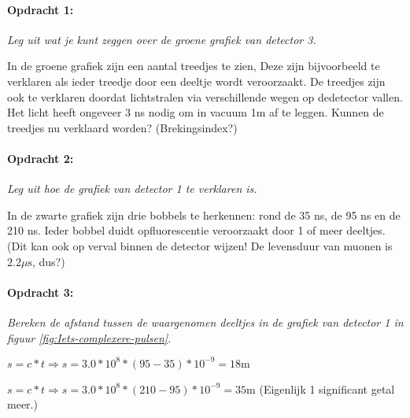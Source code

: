 \begin{minipage}[t]{1\columnwidth}%

\paragraph{Opdracht 1:}

\textit{Leg uit wat je kunt zeggen over de groene grafiek van detector
3. }

%
In de groene grafiek zijn een aantal treedjes te zien, Deze zijn bijvoorbeeld
te verklaren als ieder treedje door een deeltje wordt veroorzaakt.
De treedjes zijn ook te verklaren doordat lichtstralen via verschillende
wegen op dedetector vallen. Het licht heeft ongeveer 3 ns nodig om
in vacuum 1m af te leggen. Kunnen de treedjes nu verklaard worden?
(Brekingsindex?)%
%
\end{minipage}

\begin{minipage}[t]{1\columnwidth}%

\paragraph{Opdracht 2:}

\textit{Leg uit hoe de grafiek van detector 1 te verklaren is.}

%
In de zwarte grafiek zijn drie bobbels te herkennen: rond de 35 ns,
de 95 ns en de 210 ns. Ieder bobbel duidt opfluorescentie veroorzaakt
door 1 of meer deeltjes. (Dit kan ook op verval binnen de detector
wijzen! De levensduur van muonen is $2.2\mu\mathrm{s}$, dus?)%
%
\end{minipage}

\begin{minipage}[t]{1\columnwidth}%

\paragraph{Opdracht 3:}

\textit{Bereken de afstand tussen de waargenomen deeltjes in de grafiek
van detector 1 in figuur \ref{fig:Iets-complexere-pulsen}.}

%
$s=c*t\Rightarrow s=3.0*10^{8}*\left(95-35\right)*10^{-9}=18\mathrm{m}$

$s=c*t\Rightarrow s=3.0*10^{8}*\left(210-95\right)*10^{-9}=35\mathrm{m}$
(Eigenlijk 1 significant getal meer.)%
%
\end{minipage}


